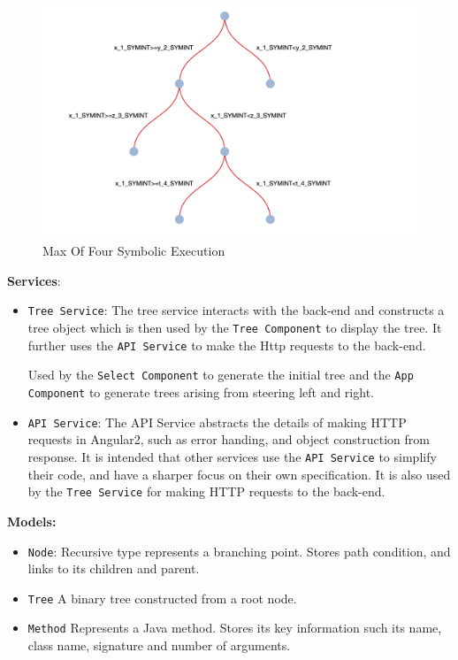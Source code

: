 \documentclass[titlepage,11pt]{article}
\begin{document}
\begin{figure}
\centering
\includegraphics[scale=0.45]{d3-maxOf4.png}
\caption{Max Of Four Symbolic Execution}
\label{fig:visibled3}
\end{figure}

\textbf{Services}:
\begin{itemize}
\item \texttt{Tree Service}: The tree service interacts with the back-end and constructs a tree object which is then used by the \texttt{Tree Component} to display the tree. It further uses the \texttt{API Service} to make the Http requests to the back-end.

Used by the \texttt{Select Component} to generate the initial tree and the \texttt{App Component} to generate trees arising from steering left and right.

\item \texttt{API Service}: The API Service abstracts the details of making HTTP requests in Angular2, such as error handing, and object construction from response. It is intended that other services use the \texttt{API Service} to simplify their code, and have a sharper focus on their own specification. It is also used by the \texttt{Tree Service} for making HTTP requests to the back-end.

\end{itemize}

\textbf{Models:}

\begin{itemize}
\item \texttt{Node}: 
Recursive type represents a branching point. Stores path condition, and links to its children and parent.
\item \texttt{Tree}
A binary tree constructed from a root node.
\item \texttt{Method}
Represents a Java method. Stores its key information such its name, class name, signature and number of arguments.
\end{itemize}
\end{document}
